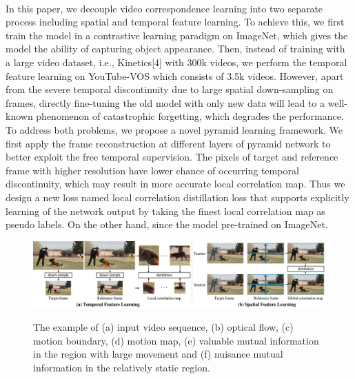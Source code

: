 \documentclass{article}
\begin{document}
\\
In this paper, we decouple video correspondence learning into two separate process including spatial and temporal feature learning. To achieve this, we first train the model in a contrastive learning paradigm on ImageNet, which gives the model the ability of capturing object appearance. Then, instead of training with a large video dataset, i.e., Kinetics[4] with 300k videos, we perform the temporal feature learning on YouTube-VOS which consists of 3.5k videos. However, apart from the severe temporal discontinuity due to large spatial down-sampling on frames, directly fine-tuning the old model with only new data will lead to a well-known phenomenon of catastrophic forgetting, which degrades the performance. To address both problems, we propose a novel pyramid learning framework. We first apply the frame reconstruction at different layers of pyramid network to better exploit the free temporal supervision. The pixels of target and reference frame with  higher resolution have lower chance of occurring temporal discontinuity, which may result in more accurate local correlation map. Thus we design a new loss named local correlation distillation loss that supports explicitly learning of the network output by taking the finest local correlation map as pseudo labels. On the other hand, since the model pre-trained on ImageNet.


\begin{figure}[!tb]
  \centering
  {\includegraphics[width=1.0\textwidth]{figure/tissor/tissor6.pdf}}
  \caption{\small The example of (a) input video sequence, (b) optical flow, (c) motion boundary, (d) motion map, (e) valuable mutual information in the region with large movement and (f) nuisance mutual information in the relatively static region.}
  \label{fig:tissor}
\end{figure}
\end{document}
